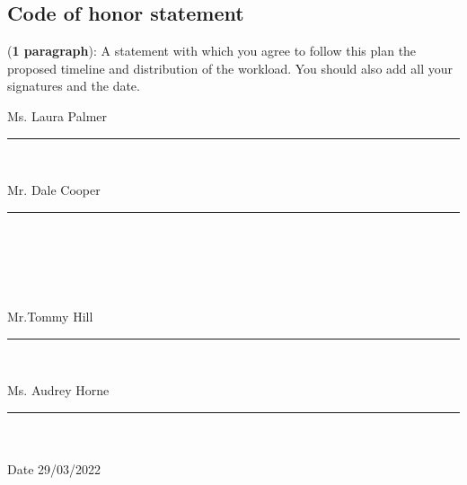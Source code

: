 \documentclass{article}
\begin{document}
\subsection{Code of honor statement}
(\textbf{1 paragraph}): A statement with which you agree to follow this plan the proposed timeline and distribution of the workload. You should also add all your signatures and the date.
\\[12pt]


\vfill
\newcommand{\namesigdate}[2][4cm]{%
\begin{minipage}{#1}
    #2 \vspace{1cm}\hrule\smallskip
\end{minipage}
}

\noindent \namesigdate{Ms. Laura Palmer} \ \hfill \namesigdate[4cm]{Mr. Dale Cooper} 
\\
\\
\vspace{1cm}\smallskip \\ \\ 
\noindent \namesigdate{Mr.Tommy Hill} \ \hfill \namesigdate[4cm]{Ms. Audrey Horne}
\\
\\
Date 29/03/2022
\\
\end{document}
